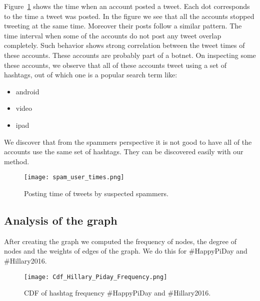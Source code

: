 \documentclass[journal, a4paper, 12pt]{article}
\begin{document}
Figure~\ref{fig:spam_user_times} shows the time when an account posted a tweet. Each dot corresponds to the time a tweet was posted. In the figure we see that all the accounts stopped tweeting at the same time. Moreover their posts follow a similar pattern. The time interval when some of the accounts do not post any tweet overlap completely. Such behavior shows strong correlation between the tweet times of these accounts. These accounts are probably part of a botnet. On inspecting some these accounts, we observe that all of these accounts tweet using a set of hashtags, out of which one is a popular search term like:
\begin{itemize}
\item android
\item video
\item ipad
\end{itemize}

We discover that from the spammers perspective it is not good to have all of the accounts use the same set of hashtags. They can be discovered easily with our method. 

\begin{figure}[!hbt]
		\begin{center}
		\texttt{[image: spam\_user\_times.png]}
		\caption{Posting time of tweets by suspected spammers.}
		\label{fig:spam_user_times}
		\end{center}
	\end{figure}

\subsection{Analysis of the graph}

After creating the graph we computed the frequency of nodes, the degree of nodes and the weights of edges of the graph. We do this for \#HappyPiDay and \#Hillary2016.
\\

        \begin{figure}[!hbt]
		\begin{center}
		\texttt{[image: Cdf\_Hillary\_Piday\_Frequency.png]}
		\caption{CDF of hashtag frequency \#HappyPiDay and \#Hillary2016.}
		\label{fig:cdf_hillary_piday_frequency}
		\end{center}
	\end{figure}
    
\end{document}
